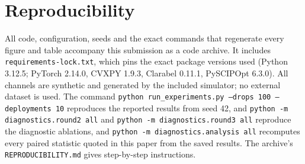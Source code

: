 \documentclass[conference]{IEEEtran}
\begin{document}
\section*{Reproducibility}
All code, configuration, seeds and the exact commands that regenerate every
figure and table accompany this submission as a code archive. It includes
\texttt{requirements-lock.txt}, which pins the exact package versions used
(Python 3.12.5; PyTorch 2.14.0, CVXPY 1.9.3, Clarabel 0.11.1, PySCIPOpt
6.3.0). All channels are synthetic and generated by the included simulator;
no external dataset is used. The command
\texttt{python run\_experiments.py --drops 100 --deployments 10} reproduces the
reported results from seed 42, and \texttt{python -m diagnostics.round2 all}
and \texttt{python -m diagnostics.round3 all} reproduce the diagnostic
ablations, and \texttt{python -m diagnostics.analysis all} recomputes every
paired statistic quoted in this paper from the saved results. The archive's
\texttt{REPRODUCIBILITY.md} gives step-by-step instructions.
\end{document}
